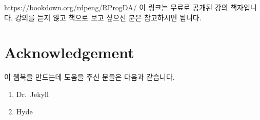 \documentclass[10pt,]{krantz}
\providecommand{\tightlist}{%
  \setlength{\itemsep}{0pt}\setlength{\parskip}{0pt}}
\theoremstyle{definition}
\theoremstyle{definition}
\theoremstyle{remark}
\begin{document}
\url{https://bookdown.org/rdpeng/RProgDA/} 이 링크는 무료로 공개된 강의
책자입니다. 강의를 듣지 않고 책으로 보고 싶으신 분은 참고하시면 됩니다.

\chapter{Acknowledgement}\label{acknowledgement}

이 웹북을 만드는데 도움을 주신 분들은 다음과 같습니다.

\begin{enumerate}
\def\labelenumi{\arabic{enumi}.}
\tightlist
\item
  Dr.~Jekyll
\item
  Hyde
\end{enumerate}



\backmatter
\printindex
\end{document}
